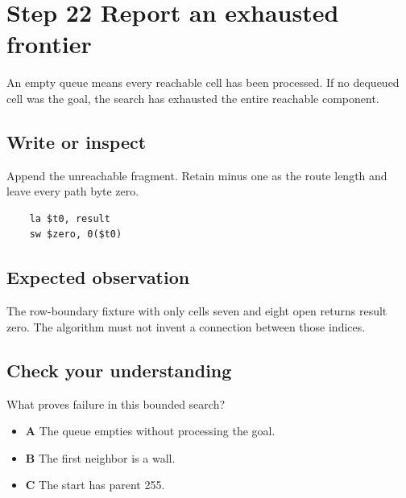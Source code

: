 \section{Step 22 Report an exhausted frontier}\label{maze-s22}

An empty queue means every reachable cell has been processed. If no dequeued cell was the goal, the search has exhausted the entire reachable component.

\subsection{Write or inspect}

Append the unreachable fragment. Retain minus one as the route length and leave every path byte zero.

\begin{verbatim}
    la $t0, result
    sw $zero, 0($t0)
\end{verbatim}

\subsection{Expected observation}

The row-boundary fixture with only cells seven and eight open returns result zero. The algorithm must not invent a connection between those indices.

\subsection{Check your understanding}

What proves failure in this bounded search?

\begin{itemize}
  \item \textbf{A} The queue empties without processing the goal.
  \item \textbf{B} The first neighbor is a wall.
  \item \textbf{C} The start has parent 255.
\end{itemize}
